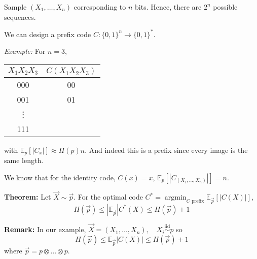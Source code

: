 \documentclass[12pt]{report}
\newcommand{\E}{\mathbb{E}}
\newcommand{\abs}[1]{\left\vert #1 \right\vert}
\newcommand{\iid}{\overset{\text{iid}}{\sim}}
\newcommand*{\tbf}[1]{\ifmmode\mathbf{#1}\else\textbf{#1}\fi}
\DeclareMathOperator*{\argmin}{\arg\min}
\newenvironment*{proposition}[1][gray]{
\begin{tcolorbox}[
    parbox=false,
    colback=#1!5!white,
    colframe=#1!75!black,
    breakable
]}
{\end{tcolorbox}}
\begin{document}
Sample $(X_1, \dots, X_n)$ corresponding to $n$ bits. Hence, there are $2^n$ possible sequences.

We can design a prefix code $C: \{0, 1\}^n \to \{0, 1\}^*$.

\emph{Example:} For $n = 3$,

\qquad\begin{tabular}{c|c}
    $X_1X_2X_3$ & $C(X_1X_2X_3)$ \\ \hline
    000         & 00             \\
    001         & 01             \\
    \vdots                       \\
    111
\end{tabular}

with $\E_p[\abs{C_x}] \approx H(p)n$. And indeed this is a prefix since every image is the same length.

We know that for the identity code, $C(x) = x$, $\E_p [\abs{C_{(X_1, \dots, X_n)}}] = n$.

\begin{proposition}
    \textbf{Theorem:} Let $\vec X \sim \vec p$. For the optimal code $C^* = \argmin_{C \text{ prefix}} \E_{\vec p} [\abs{C(X)}]$,
    \[H(\vec p) \leq \abs{\E_{\vec p}} C^*(X) \leq H(\vec p ) + 1\]
\end{proposition}

\tbf{Remark: }In our example, $\vec X = (X_1, \dots, X_n), \quad X_i \iid p$ so
\[H(\vec p) \leq \E_{\vec p} \abs{C(X)} \leq H(\vec p) + 1\]
where $\vec p = p \otimes \dots \otimes p$.
\end{document}
